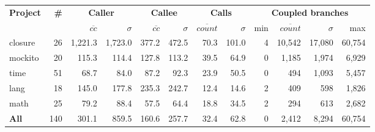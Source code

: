 \footnotesize
\begin{tabular}{ l r | rr | rr | rr | rrrr }
\hline 
\textbf{Project} & \textbf{\#} & \multicolumn{2}{c}{\textbf{Caller}} & \multicolumn{2}{c}{\textbf{Callee}} & \multicolumn{2}{c}{\textbf{Calls}} & \multicolumn{4}{c}{\textbf{Coupled branches}} \\ 
 &  & $\overline{cc}$ & $\sigma$ & $\overline{cc}$ & $\sigma$ & $\overline{count}$ & $\sigma$ & min & $\overline{count}$ & $\sigma$ & max \\  
\hline 
closure & 26 & 1,221.3 & 1,723.0 & 377.2 & 472.5 & 70.3 & 101.0 & 4 & 10,542 & 17,080 & 60,754 \\ 
mockito & 20 & 115.3 & 114.4 & 127.8 & 113.2 & 39.5 & 64.9 & 0 & 1,185 & 1,974 & 6,929 \\ 
time & 51 & 68.7 & 84.0 & 87.2 & 92.3 & 23.9 & 50.5 & 0 & 494 & 1,093 & 5,457 \\ 
lang & 18 & 145.0 & 177.8 & 235.3 & 242.7 & 12.4 & 14.6 & 2 & 409 & 598 & 1,826 \\ 
math & 25 & 79.2 & 88.4 & 57.5 & 64.4 & 18.8 & 34.5 & 2 & 294 & 613 & 2,682 \\ 
\hline 
\textbf{All} & 140 & 301.1 & 859.5 & 160.6 & 257.7 & 32.4 & 62.8 & 0 & 2,412 & 8,294 & 60,754 \\ 
\hline 
\end{tabular}
 